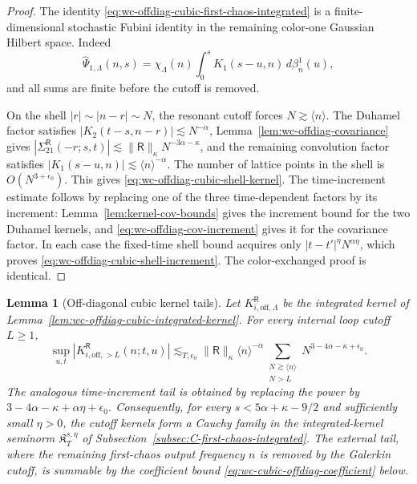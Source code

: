 \documentclass[10pt]{amsart}
\numberwithin{equation}{section}
\theoremstyle{plain}
\newtheorem{lemma}[theorem]{Lemma}
\theoremstyle{definition}
\theoremstyle{remark}
\begin{document}
\begin{proof}
The identity \eqref{eq:wc-offdiag-cubic-first-chaos-integrated} is a finite-dimensional stochastic Fubini identity in the remaining color-one Gaussian Hilbert space.  Indeed
\[
        \widehat\Psi_{1,\Lambda}(n,s)
        =\chi_\Lambda(n)\int_0^s K_1(s-u,n)\,d\beta_n^1(u),
\]
and all sums are finite before the cutoff is removed.

On the shell \(|r|\sim |n-r|\sim N\), the resonant cutoff forces \(N\gtrsim\langle n\rangle\).  The Duhamel factor satisfies \(|K_2(t-s,n-r)|\lesssim N^{-\alpha}\), Lemma~\ref{lem:wc-offdiag-covariance} gives
\(|\Sigma_{21}^{\mathsf R}(-r;s,t)|\lesssim\|\mathsf R\|_\kappa N^{-3\alpha-\kappa}\), and the remaining convolution factor satisfies \(|K_1(s-u,n)|\lesssim \langle n\rangle^{-\alpha}\).  The number of lattice points in the shell is \(O(N^{3+\epsilon_0})\).  This gives \eqref{eq:wc-offdiag-cubic-shell-kernel}.  The time-increment estimate follows by replacing one of the three time-dependent factors by its increment: Lemma~\ref{lem:kernel-cov-bounds} gives the increment bound for the two Duhamel kernels, and \eqref{eq:wc-offdiag-cov-increment} gives it for the covariance factor.  In each case the fixed-time shell bound acquires only \(|t-t'|^\eta N^{\alpha\eta}\), which proves \eqref{eq:wc-offdiag-cubic-shell-increment}.  The color-exchanged proof is identical.
\end{proof}

\begin{lemma}[Off-diagonal cubic kernel tails]\label{lem:wc-offdiag-cubic-kernel-tails}
Let \(K_{i,\mathrm{off},\Lambda}^{\mathsf R}\) be the integrated kernel of Lemma~\ref{lem:wc-offdiag-cubic-integrated-kernel}.  For every internal loop cutoff \(L\ge1\),
\begin{equation}\label{eq:wc-offdiag-cubic-internal-tail}
\sup_{u,t}|K_{i,\mathrm{off},>L}^{\mathsf R}(n;t,u)|
\lesssim_{T,\epsilon_0}
\|\mathsf R\|_\kappa\langle n\rangle^{-\alpha}
\sum_{\substack{N\gtrsim\langle n\rangle\\ N>L}}
N^{3-4\alpha-\kappa+\epsilon_0}.
\end{equation}
The analogous time-increment tail is obtained by replacing the power by
\(3-4\alpha-\kappa+\alpha\eta+\epsilon_0\).  Consequently, for every
\(s<5\alpha+\kappa-9/2\) and sufficiently small \(\eta>0\), the cutoff kernels form a Cauchy family in the integrated-kernel seminorm \(\mathfrak K_T^{s,\eta}\) of Subsection~\ref{subsec:C-first-chaos-integrated}.  The external tail, where the remaining first-chaos output frequency \(n\) is removed by the Galerkin cutoff, is summable by the coefficient bound \eqref{eq:wc-cubic-offdiag-coefficient} below.
\end{lemma}
\end{document}
